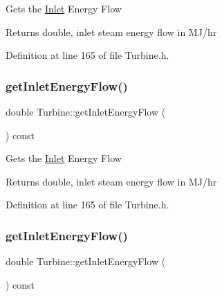 Gets the \hyperlink{class_inlet}{Inlet} Energy Flow

\begin{DoxyReturn}{Returns}
double, inlet steam energy flow in M\+J/hr 
\end{DoxyReturn}


Definition at line 165 of file Turbine.\+h.

\mbox{\label{class_turbine_ae5d55a7b882e4780d490d43409f8f06c}} 
\subsubsection{\texorpdfstring{get\+Inlet\+Energy\+Flow()}{getInletEnergyFlow()}\hspace{0.1cm}{\footnotesize\ttfamily [2/3]}}
{\footnotesize\ttfamily double Turbine\+::get\+Inlet\+Energy\+Flow (\begin{DoxyParamCaption}{ }\end{DoxyParamCaption}) const\hspace{0.3cm}{\ttfamily [inline]}}

Gets the \hyperlink{class_inlet}{Inlet} Energy Flow

\begin{DoxyReturn}{Returns}
double, inlet steam energy flow in M\+J/hr 
\end{DoxyReturn}


Definition at line 165 of file Turbine.\+h.

\mbox{\label{class_turbine_ae5d55a7b882e4780d490d43409f8f06c}} 
\subsubsection{\texorpdfstring{get\+Inlet\+Energy\+Flow()}{getInletEnergyFlow()}\hspace{0.1cm}{\footnotesize\ttfamily [3/3]}}
{\footnotesize\ttfamily double Turbine\+::get\+Inlet\+Energy\+Flow (\begin{DoxyParamCaption}{ }\end{DoxyParamCaption}) const\hspace{0.3cm}{\ttfamily [inline]}}

